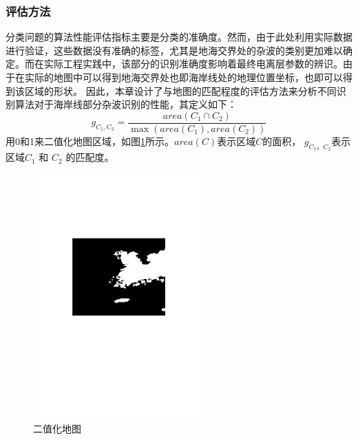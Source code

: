 \subsubsection{评估方法}
分类问题的算法性能评估指标主要是分类的准确度。然而，由于此处利用实际数据进行验证，这些数据没有准确的标签，尤其是地海交界处的杂波的类别更加难以确定。而在实际工程实践中，该部分的识别准确度影响着最终电离层参数的辨识。由于在实际的地图中可以得到地海交界处也即海岸线处的地理位置坐标，也即可以得到该区域的形状。
因此，本章设计了与地图的匹配程度的评估方法来分析不同识别算法对于海岸线部分杂波识别的性能，其定义如下：
\begin{equation}
g_{C_1, C_2} = \frac{area({C_1\cap C_2})}{\max(area({C_1}), area({C_2}))}
\end{equation}
用0和1来二值化地图区域，如图\ref{fig:binary}所示。$area(C)$表示区域$C$的面积， $g_{C_1， C_2}$表示区域$C_1$ 和 $C_2$ 的匹配度。
\begin{figure}[hbt]
	\centering
	\includegraphics[width=6.67cm]{figures/othr/binary}
	\caption{二值化地图}
	\label{fig:binary}
\end{figure}

